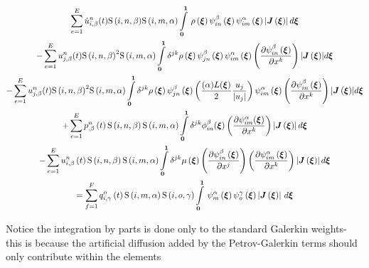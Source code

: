 \begin{multline}
 \label{NSEFEM4}
  \dsum_{e=1}^{E}{\idxnodedof{\dot{u}}{i}{n}{\beta}}(t){\idxgsf{i}{n}{\beta}}{\idxgsf{i}{m}{\alpha}}
  \gint{\vectr{0}}{\vectr{1}}{\fnof{\rho}{\vectr{\xi}}{\idxgbfn{i}{n}{\beta}{\vectr{\xi}}\idxgbfn{i}{m}{\alpha}{\vectr{\xi}}
  \abs{\fnof{\matr{J}}{\vectr{\xi}}}}}{\vectr{\xi}}\\
  -\dsum_{e=1}^{E}{\idxnodedof{u}{j}{n}{\beta}}(t){\idxgsf{i}{n}{\beta}}^2{\idxgsf{i}{m}{\alpha}}
   \dintl{\vectr{0}}{\vectr{1}}\delta^{jk}{\fnof{\rho}{\vectr{\xi}}\idxgbfn{j}{n}{\beta}{\vectr{\xi}}
    \idxgbfn{i}{m}{\alpha}{\vectr{\xi}}
     \pbrac{\delby{\idxgbfn{i}{n}{\beta}{\vectr{\xi}}}{x^{k}}}
  \abs{\fnof{\matr{J}}{\vectr{\xi}}}}d{\vectr{\xi}}\\
  -\dsum_{e=1}^{E}{\idxnodedof{u}{j}{n}{\beta}}(t){\idxgsf{i}{n}{\beta}}^2{\idxgsf{i}{m}{\alpha}}
   \dintl{\vectr{0}}{\vectr{1}}\delta^{jk}{\fnof{\rho}{\vectr{\xi}}\idxgbfn{j}{n}{\beta}{\vectr{\xi}}
    \pbrac{\frac{(\alpha){L(\vectr{\xi})}}{2}{\frac{u_j}{\abs{u_j}}}}\idxgbfn{i}{m}{\alpha}{\vectr{\xi}}
     \pbrac{\delby{\idxgbfn{i}{n}{\beta}{\vectr{\xi}}}{x^{k}}}
  \abs{\fnof{\matr{J}}{\vectr{\xi}}}}d{\vectr{\xi}}\\
    +\dsum_{e=1}^{E}{\fnof{\idxnodedof{p}{}{n}{\beta}}{t}\idxgsf{i}{n}{\beta}\idxgsf{i}{m}{\alpha}}
    \dintl{\vectr{0}}{\vectr{1}}\delta^{jk}\phi_{in}^{\beta}({\vectr{\xi}})
    \pbrac{\delby{\psi_{im}^{\alpha}({\vectr{\xi}})}{x^{k}}}\abs{\fnof{\matr{J}}{\vectr{\xi}}}d\vectr{\xi}\\
    -\dsum_{e=1}^{E}\fnof{\idxnodedof{u}{i}{n}{\beta}}{t}\idxgsf{i}{n}{\beta}\idxgsf{i}{m}{\alpha}
    \dintl{\vectr{0}}{\vectr{1}}{\delta^{jk}\fnof{\mu}{\vectr{\xi}}}\pbrac{\delby{\idxgbfn{i}{n}{\beta}{\vectr{\xi}}}{x^{j}}}
      \pbrac{\delby{\idxgbfn{i}{m}{\alpha}{\vectr{\xi}}}{x^{k}}}
      \abs{\fnof{\matr{J}}{\vectr{\xi}}}d{\vectr{\xi}}\\
  =\dsum_{f=1}^{F}\fnof{\idxnodedof{q}{i}{o}{\gamma}}{t}\idxgsf{i}{m}{\alpha}\idxgsf{i}{o}{\gamma}
   \gint{\vectr{0}}{\vectr{1}}{\gbfn{m}{\alpha}{\vectr{\xi}}\gbfn{o}{\gamma}{\vectr{\xi}}
    \abs{\fnof{\matr{J}}{\vectr{\xi}}}}{\vectr{\xi}}\\
\end{multline}

Notice the integration by parts is done only to the standard Galerkin weights- this is because the artificial diffusion added by the Petrov-Galerkin terms should only contribute within the elements

